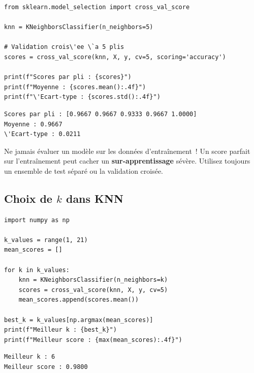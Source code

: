 \begin{codeblock}[title=\textbf{Python}]
\begin{verbatim}
from sklearn.model_selection import cross_val_score

knn = KNeighborsClassifier(n_neighbors=5)

# Validation crois\'ee \`a 5 plis
scores = cross_val_score(knn, X, y, cv=5, scoring='accuracy')

print(f"Scores par pli : {scores}")
print(f"Moyenne : {scores.mean():.4f}")
print(f"\'Ecart-type : {scores.std():.4f}")
\end{verbatim}
\end{codeblock}

\begin{codeoutput}
\begin{verbatim}
Scores par pli : [0.9667 0.9667 0.9333 0.9667 1.0000]
Moyenne : 0.9667
\'Ecart-type : 0.0211
\end{verbatim}
\end{codeoutput}

\begin{attention}
Ne jamais \'evaluer un mod\`ele sur les donn\'ees d'entra\^inement~! Un score parfait sur l'entra\^inement peut cacher un \textbf{sur-apprentissage} s\'ev\`ere. Utilisez toujours un ensemble de test s\'epar\'e ou la validation crois\'ee.
\end{attention}

\subsection{Choix de $k$ dans KNN}

\begin{codeblock}[title=\textbf{Python}]
\begin{verbatim}
import numpy as np

k_values = range(1, 21)
mean_scores = []

for k in k_values:
    knn = KNeighborsClassifier(n_neighbors=k)
    scores = cross_val_score(knn, X, y, cv=5)
    mean_scores.append(scores.mean())

best_k = k_values[np.argmax(mean_scores)]
print(f"Meilleur k : {best_k}")
print(f"Meilleur score : {max(mean_scores):.4f}")
\end{verbatim}
\end{codeblock}

\begin{codeoutput}
\begin{verbatim}
Meilleur k : 6
Meilleur score : 0.9800
\end{verbatim}
\end{codeoutput}

